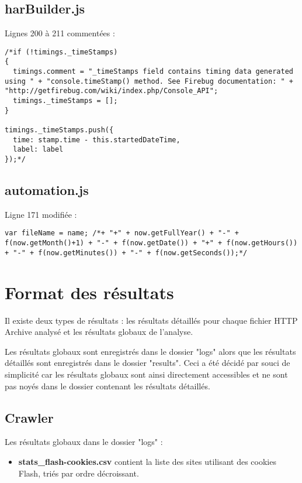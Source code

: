 \section{harBuilder.js}
\label{harBuilder}
Lignes 200 à 211 commentées :
\begin{lstlisting}[frame=single]
/*if (!timings._timeStamps)
{
  timings.comment = "_timeStamps field contains timing data generated using " + "console.timeStamp() method. See Firebug documentation: " + "http://getfirebug.com/wiki/index.php/Console_API";
  timings._timeStamps = [];
}

timings._timeStamps.push({
  time: stamp.time - this.startedDateTime,
  label: label
});*/
\end{lstlisting}

\section{automation.js}
\label{automation}
Ligne 171 modifiée :
\begin{lstlisting}[frame=single]
var fileName = name; /*+ "+" + now.getFullYear() + "-" + f(now.getMonth()+1) + "-" + f(now.getDate()) + "+" + f(now.getHours()) + "-" + f(now.getMinutes()) + "-" + f(now.getSeconds());*/
\end{lstlisting}


\chapter{Format des résultats}
\label{format_resultats}
Il existe deux types de résultats : les résultats détaillés pour chaque fichier HTTP Archive analysé et les résultats globaux de l'analyse.

Les résultats globaux sont enregistrés dans le dossier "logs" alors que les résultats détaillés sont enregistrés dans le dossier "results".
Ceci a été décidé par souci de simplicité car les résultats globaux sont ainsi directement accessibles et ne sont pas noyés dans le dossier contenant les résultats détaillés.

\section{Crawler}
Les résultats globaux dans le dossier "logs" :
\begin{itemize}
	\item \textbf{stats\_flash-cookies.csv} contient la liste des sites utilisant des cookies Flash, triés par ordre décroissant.
\end{itemize}

